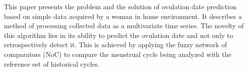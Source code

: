 
This paper presents the problem and the solution of ovulation date prediction based on simple data acquired by a woman in home environment. It describes a method of processing collected data as a multivariate time series. The novelty of this algorithm lies in its ability to predict the ovulation date and not only to retrospectively detect it. This is achieved by applying the fuzzy network of comparators (NoC) to compare the menstrual cycle being analyzed with the reference set of historical cycles. 
